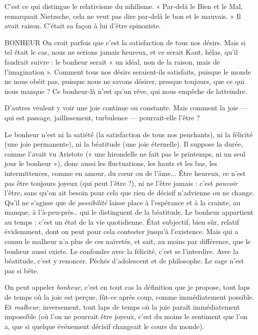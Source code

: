 C’est ce qui distingue le relativisme du nihilisme. « Par-delà le Bien et le
Mal, remarquait Nietzsche, cela ne veut pas dire par-delà le bon et le mauvais. »
Il avait raison. C’était sa façon à lui d’être spinoziste.

BONHEUR On croit parfois que c’est la satisfaction de tous nos désirs. Mais
si tel était le cas, nous ne serions jamais heureux, et ce serait
Kant, hélas, qu’il faudrait suivre : le bonheur serait « un idéal, non de la raison,
mais de l’imagination ». Comment tous nos désirs seraient-ils satisfaits, puisque
le monde ne nous obéit pas, puisque nous ne savons désirer, presque toujours,
que ce qui nous manque ? Ce bonheur-là n’est qu’un rêve, qui nous empêche
de latteindre.

D’autres veulent y voir une joie continue ou constante. Mais comment la
joie — qui est passage, jaillissement, turbulence — pourrait-elle l'être ?

Le bonheur n’est ni la satiété (la satisfaction de tous nos penchants), ni la
félicité (une joie permanente), ni la béatitude (une joie éternelle). Il suppose la
durée, comme l’avait vu Aristote (« une hirondelle ne fait pas le printemps, ni
un seul jour le bonheur »), donc aussi les fluctuations, les hauts et les bas, les
intermittences, comme en amour, du cœur ou de l'âme... Être heureux, ce
n'est pas être toujours joyeux (qui peut l'être ?), ni ne l’être jamais : c’est {\it pouvoir}
l'être, sans qu’on ait besoin pour cela que rien de décisif n’advienne ou ne
change. Qu'il ne s'agisse que de {\it possibilité} laisse place à l’espérance et à la
crainte, au manque, à l’à-peu-près.. qui le distinguent de la béatitude. Le bonheur
appartient au temps : c’est un état de la vie quotidienne. État subjectif,
bien sûr, relatif évidemment, dont on peut pour cela contester jusqu’à l’existence.
Mais qui a connu le malheur n’a plus de ces naïvetés, et sait, au moins
par différence, que le bonheur aussi existe. Le confondre avec la félicité, c’est se
l’interdire. Avec la béatitude, c’est y renoncer. Péchés d’adolescent et de philosophe.
Le sage n’est pas si bête.

On peut appeler {\it bonheur}, c’est en tout cas la définition que je propose, tout
laps de temps où la joie est perçue, fût-ce après coup, comme immédiatement
possible. Et {\it malheur}, inversement, tout laps de temps où la joie paraît immédiatement
impossible (où l’on ne pourrait être joyeux, c’est du moins le sentiment
que l’on a, que si quelque événement décisif changeait le cours du
monde).

